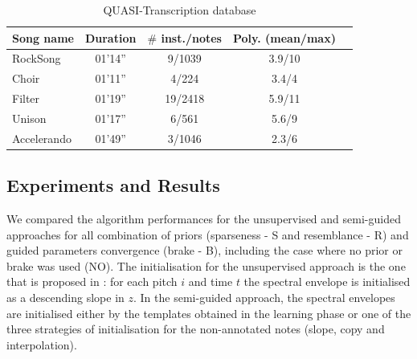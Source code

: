 \documentclass{article}
\begin{document}
\begin{table}[htb]
\centering
\begin{tabular}{lcccc}
\\
\hline
Song name & Duration & $\#$ inst./notes & Poly. (mean/max) \\\hline
RockSong & 01'14'' & 9/1039 & 3.9/10 \\
Choir & 01'11'' & 4/224 & 3.4/4 \\
Filter & 01'19'' & 19/2418 & 5.9/11 \\
Unison & 01'17'' & 6/561 & 5.6/9 \\
Accelerando & 01'49'' & 3/1046 & 2.3/6 \\
\end{tabular}
\caption{QUASI-Transcription database}
\label{tab:quaero}
\end{table}

\vspace{0.3cm}

\subsection{Experiments and Results}


We compared the algorithm performances for the unsupervised and semi-guided approaches for all combination of priors (sparseness - S and resemblance - R) and guided parameters convergence (brake - B), including the case where no prior or brake was used (NO). The initialisation for the unsupervised approach is the one that is proposed in \cite{Fuentes2013_PhD}: for each pitch $i$ and time $t$ the spectral envelope is initialised as a descending slope in $z$. In the semi-guided approach, the spectral envelopes are initialised either by the templates obtained in the learning phase or one of the three strategies of initialisation for the non-annotated notes (slope, copy and interpolation).
\end{document}
